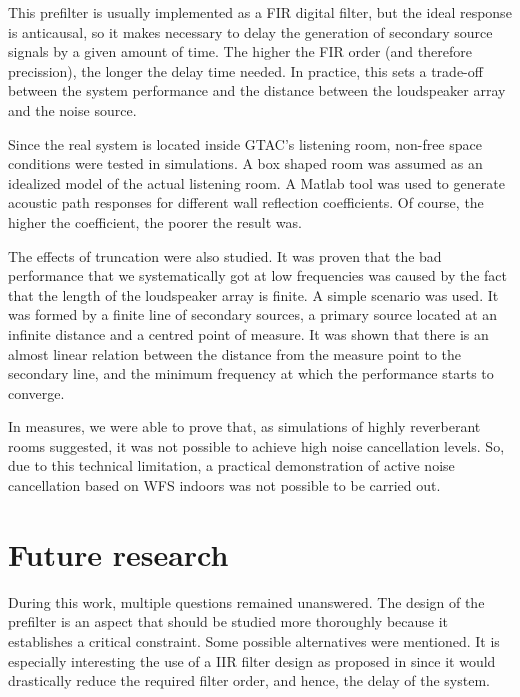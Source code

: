 This prefilter is usually implemented as a FIR digital filter, but the ideal response is anticausal, so it makes necessary to delay the generation of secondary source signals by a given amount of time. The higher the FIR order (and therefore precission), the longer the delay time needed. In practice, this sets a trade-off between the system performance and the distance between the loudspeaker array and the noise source.

Since the real system is located inside GTAC's listening room, non-free space conditions were tested in simulations. A box shaped room was assumed as an idealized model of the actual listening room. A Matlab tool was used to generate acoustic path responses for different wall reflection coefficients. Of course, the higher the coefficient, the poorer the result was.

The effects of truncation were also studied. It was proven that the bad performance that we systematically got at low frequencies was caused by the fact that the length of the loudspeaker array is finite. A simple scenario was used. It was formed by a finite line of secondary sources, a primary source located at an infinite distance and a centred point of measure. It was shown that there is an almost linear relation between the distance from the measure point to the secondary line, and the minimum frequency at which the performance starts to converge.

In measures, we were able to prove that, as simulations of highly reverberant rooms suggested, it was not possible to achieve high noise cancellation levels. So, due to this technical limitation, a practical demonstration of active noise cancellation based on WFS indoors was not possible to be carried out.

\section{Future research}
During this work, multiple questions remained unanswered. The design of the prefilter is an aspect that should be studied more thoroughly because it establishes a critical constraint. Some possible alternatives were mentioned. It is especially interesting the use of a IIR filter design as proposed in \cite{FrankSchutz2015} since it would drastically reduce the required filter order, and hence, the delay of the system.

